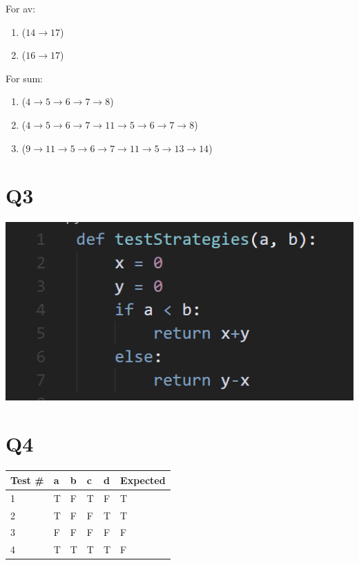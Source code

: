 \documentclass[12pt, letterpaper, titlepage]{article}
\begin{document}
For av:
\begin{enumerate}
    \item ($14 \rightarrow 17$)
    \item ($16 \rightarrow 17$)
\end{enumerate}
For sum: 
\begin{enumerate}
    \item ($4 \rightarrow 5 \rightarrow 6 \rightarrow 7 \rightarrow 8$)
    \item ($4 \rightarrow 5 \rightarrow 6 \rightarrow 7 \rightarrow 11 \rightarrow 5 \rightarrow 6 \rightarrow 7 \rightarrow 8$)
    \item ($9 \rightarrow 11 \rightarrow 5 \rightarrow 6 \rightarrow 7 \rightarrow 11 \rightarrow 5 \rightarrow 13 \rightarrow 14 $)

\end{enumerate}

\section*{Q3}
\includegraphics{code1.png}

\section*{Q4}
\begin{table}[H]
    \begin{tabular}{|l|l|l|l|l|l|}
    \hline
    Test \# & a & b & c & d & Expected \\ \hline
    1       & T & F & T & F & T        \\ \hline
    2       & T & F & F & T & T        \\ \hline
    3       & F & F & F & F & F        \\ \hline
    4       & T & T & T & T & F        \\ \hline
    \end{tabular}
    \end{table}
\end{document}
